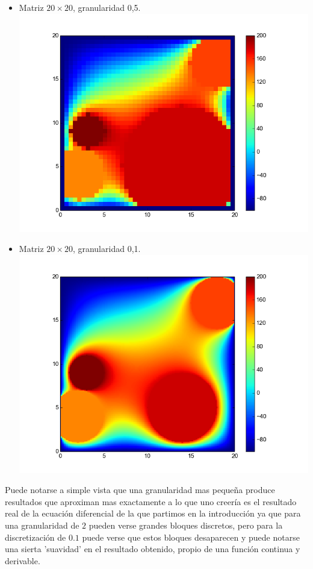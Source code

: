 \begin{itemize}
 \item Matriz $20 \times 20$, granularidad 0,5.\\
  \includegraphics[width=400pt]{imagenes/imagen31.png}
  
   \item Matriz $20 \times 20$, granularidad 0,1.\\
  \includegraphics[width=400pt]{imagenes/imagen41.png}
\end{itemize}

Puede notarse a simple vista que una granularidad mas pequeña produce resultados que aproximan mas exactamente a lo que uno creería es el resultado real de la ecuación diferencial de la que partimos en la introducción ya que para una granularidad de $2$ pueden verse grandes bloques discretos, pero para la discretización de $0.1$ puede verse que estos bloques desaparecen y puede notarse una sierta 'suavidad' en el resultado obtenido, propio de una función continua y derivable.
